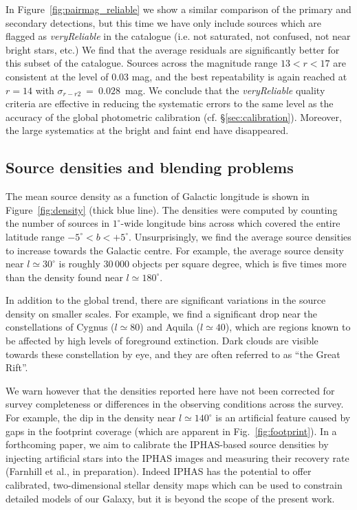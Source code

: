 \documentclass[useAMS,usenatbib]{mn2e}
\begin{document}
In Figure~\ref{fig:pairmag_reliable} we show 
a similar comparison of the primary and secondary detections,
but this time we have only include sources which are flagged
as \emph{veryReliable} in the catalogue
(i.e. not saturated, not confused, not near bright stars, etc.)
We find that the average residuals are significantly better
for this subset of the catalogue. Sources across the magnitude range 
$13 < r < 17$ are consistent at the level of 0.03 mag,
and the best repeatability is again reached at $r=14$
with $\sigma_{r-r2}~=~0.028$~mag.
We conclude that the \emph{veryReliable} quality criteria are effective
in reducing the systematic errors to
the same level as the accuracy of the
global photometric calibration (cf. \S\ref{sec:calibration}).
Moreover, the large systematics at the bright and faint end
have disappeared.

\subsection{Source densities and blending problems}
\label{sec:densities}

The mean source density as a function of Galactic longitude
is shown in Figure~\ref{fig:density} (thick blue line).
The densities were computed by counting the 
number of sources in $1^\circ$-wide longitude bins
across which covered the entire latitude range $-5^\circ<b<+5^\circ$.
Unsurprisingly, we find the average source densities to increase
towards the Galactic centre.
For example, the average source density near $l\simeq 30^\circ$
is roughly 30\,000 objects per square degree,
which is five times more than the density
found near $l\simeq 180^\circ$.

In addition to the global trend, 
there are significant variations in the source density on smaller scales.
For example,  we find a significant drop near the constellations 
of Cygnus ($l\simeq 80$) and Aquila ($l\simeq 40$),
which are regions known to be affected
by high levels of foreground extinction.
Dark clouds are visible towards these constellation by eye,
and they are often referred to as ``the Great Rift''.

We warn however that the densities reported here 
have not been corrected for survey completeness
or differences in the observing conditions across the survey.
For example, the dip in the density near $l\simeq140^\circ$
is an artificial feature caused by gaps
in the footprint coverage (which are apparent in Fig.~\ref{fig:footprint}).
In a forthcoming paper,
we aim to calibrate the IPHAS-based source densities
by injecting artificial stars into the IPHAS images
and measuring their recovery rate (Farnhill et al., in preparation).
Indeed IPHAS has the potential to offer
calibrated, two-dimensional stellar density maps
which can be used to constrain detailed models of our Galaxy,
but it is beyond the scope of the present work.
\end{document}
